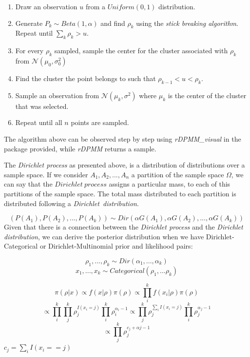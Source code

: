 \documentclass[12pt,a4paper]{article}
\begin{document}
\begin{enumerate}
    \item Draw an observation $u$ from a $Uniform(0, 1)$ distribution.  
    \item Generate $P_{k} \sim Beta(1, \alpha)$ and find $\rho_{k}$ using the \textit{stick breaking algorithm}. Repeat until $\sum_{k}\rho_{k} > u$. 
    \item For every $\rho_{k}$ sampled, sample the center for the cluster associated with $\rho_{k}$ from $\mathcal{N}(\mu_{0}, \sigma_{0}^2)$ 
    \item Find the cluster the point belongs to such that $\rho_{k-1} < u < \rho_{k}$.
    \item Sample an observation from $\mathcal{N}(\mu_{k}, \sigma^2)$ where $\mu_{k}$ is the center of the cluster that was selected.
    \item Repeat until all $n$ points are sampled.
\end{enumerate}

The algorithm above can be observed step by step using \textit{rDPMM\_visual} in the package provided, while \textit{rDPMM} returns a sample.

The \textit{Dirichlet process} as presented above, is a distribution of distributions over a sample space. If we consider $A_{1}, A_{2}, ..., A_{n}$ a partition of the sample space $\Omega$, we can say that the $Dirichlet\ process$ assigns a particular mass, to each of this partitions of the sample space. The total mass distributed to each partition is distributed following a \textit{Dirichlet\ distribution}. 

$$(P(A_{1}), P(A_{2}), ... , P(A_{k})) \sim Dir(\alpha G(A_{1}), \alpha G(A_{2}), ..., \alpha G(A_{k}))$$
Given that there is a connection between the \textit{Dirichlet process} and the \textit{Dirichlet distribution}, we can derive the posterior distribution when we have Dirichlet-Categorical or Dirichlet-Multinomial prior and likelihood pairs:

$$\rho_{1}, ... ,\rho_{k} \sim Dir(\alpha_{1}, ..., \alpha_{k})$$
$$x_{1}, ... ,x_{k} \sim Categorical(\rho_{1}, ... \rho_{k})$$

$$\displaystyle \pi(\rho|x) \propto f(x|\rho)\pi(\rho) \propto \prod_{i}^{k} f(x_{i}| \rho)\pi(\rho) $$
$$\propto \prod_{i}^k \prod_{j}^k \rho_{j}^{I(x_{i} = j)}\prod_{i}^k \rho_{i}^{\alpha_{i} - 1} \propto \prod_{j}^k \rho_{j}^{\sum_{i}I(x_{i} = j)}\prod_{i}^k \rho_{j}^{\alpha_{j} - 1}$$
$$ \propto \prod_{j}^k \rho_j^{{c_{j}} + \alpha{j} - 1}$$
$c_{j} = \sum_i I(x_{i} == j) $
\end{document}
